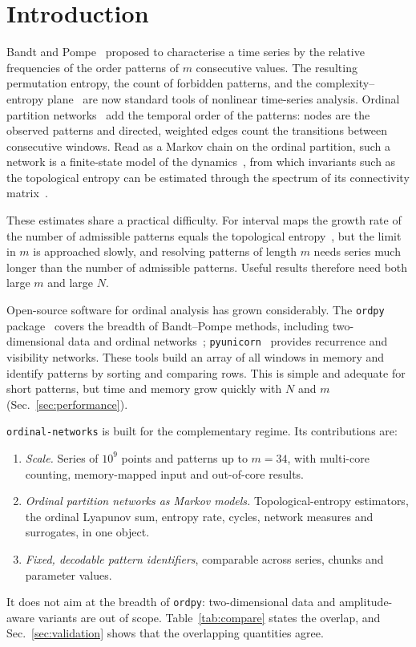 \documentclass[aip,cha,reprint,amsmath,amssymb]{revtex4-2}
\newcommand{\pkg}{\texttt{ordinal-networks}}
\newcommand{\code}[1]{\texttt{#1}}
\begin{document}
\section{Introduction}

Bandt and Pompe~\cite{bandt2002} proposed to characterise a time series by the relative
frequencies of the order patterns of $m$ consecutive values. The resulting permutation
entropy, the count of forbidden patterns, and the complexity--entropy
plane~\cite{lamberti2004,rosso2007} are now standard tools of nonlinear time-series
analysis. Ordinal partition networks~\cite{small2013,mccullough2015} add the temporal
order of the patterns: nodes are the observed patterns and directed, weighted edges count
the transitions between consecutive windows. Read as a Markov chain on the ordinal
partition, such a network is a finite-state model of the dynamics~\cite{sakellariou2019},
from which invariants such as the topological entropy can be estimated through the
spectrum of its connectivity matrix~\cite{sakellariou2021}.

These estimates share a practical difficulty. For interval maps the growth rate of the
number of admissible patterns equals the topological entropy~\cite{bandt2002b}, but the
limit in $m$ is approached slowly, and resolving patterns of length $m$ needs series
much longer than the number of admissible patterns. Useful results therefore need both
large $m$ and large $N$.

Open-source software for ordinal analysis has grown considerably. The \code{ordpy}
package~\cite{pessa2021} covers the breadth of Bandt--Pompe methods, including
two-dimensional data and ordinal networks~\cite{pessa2019}; \code{pyunicorn}~\cite{donges2015}
provides recurrence and visibility networks. These tools build an array of all windows
in memory and identify patterns by sorting and comparing rows. This is simple and
adequate for short patterns, but time and memory grow quickly with $N$ and $m$
(Sec.~\ref{sec:performance}).

\pkg{} is built for the complementary regime. Its contributions are:
\begin{enumerate}
\item \emph{Scale.} Series of $10^9$ points and patterns up to $m = 34$, with
multi-core counting, memory-mapped input and out-of-core results.
\item \emph{Ordinal partition networks as Markov models.} Topological-entropy
estimators, the ordinal Lyapunov sum, entropy rate, cycles, network measures and
surrogates, in one object.
\item \emph{Fixed, decodable pattern identifiers}, comparable across series, chunks
and parameter values.
\end{enumerate}
It does not aim at the breadth of \code{ordpy}: two-dimensional data and
amplitude-aware variants are out of scope. Table~\ref{tab:compare} states the overlap,
and Sec.~\ref{sec:validation} shows that the overlapping quantities agree.
\end{document}
